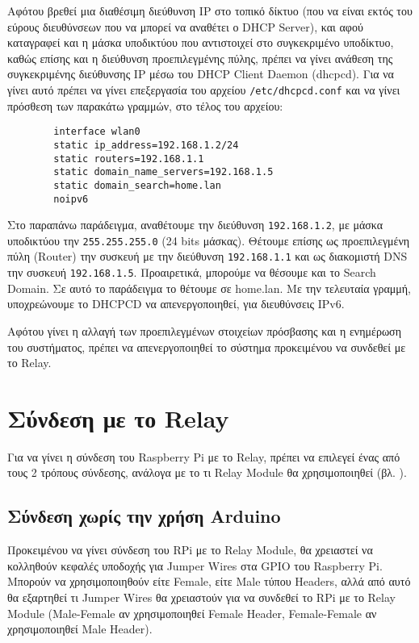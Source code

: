 		Αφότου βρεθεί μια διαθέσιμη διεύθυνση IP στο τοπικό δίκτυο (που να είναι εκτός του εύρους διευθύνσεων που να μπορεί να αναθέτει ο DHCP Server), και αφού καταγραφεί και η μάσκα υποδικτύου που αντιστοιχεί στο συγκεκριμένο υποδίκτυο, καθώς επίσης και η διεύθυνση προεπιλεγμένης πύλης, πρέπει να γίνει ανάθεση της συγκεκριμένης διεύθυνσης IP μέσω του DHCP Client Daemon (dhcpcd). Για να γίνει αυτό πρέπει να γίνει επεξεργασία του αρχείου \verb|/etc/dhcpcd.conf| και να γίνει πρόσθεση των παρακάτω γραμμών, στο τέλος του αρχείου:

		\begin{lstlisting}
		interface wlan0
		static ip_address=192.168.1.2/24
		static routers=192.168.1.1
		static domain_name_servers=192.168.1.5
		static domain_search=home.lan
		noipv6\end{lstlisting}

		Στο παραπάνω παράδειγμα, αναθέτουμε την διεύθυνση \verb|192.168.1.2|, με μάσκα υποδικτύου την \verb|255.255.255.0| (24 bits μάσκας). Θέτουμε επίσης ως προεπιλεγμένη πύλη (Router) την συσκευή με την διεύθυνση \verb|192.168.1.1| και ως διακομιστή DNS την συσκευή \verb|192.168.1.5|. Προαιρετικά, μπορούμε να θέσουμε και το Search Domain. Σε αυτό το παράδειγμα το θέτουμε σε home.lan. Με την τελευταία γραμμή, υποχρεώνουμε το DHCPCD να απενεργοποιηθεί, για διευθύνσεις IPv6.

	Αφότου γίνει η αλλαγή των προεπιλεγμένων στοιχείων πρόσβασης και η ενημέρωση του συστήματος, πρέπει να απενεργοποιηθεί το σύστημα προκειμένου να συνδεθεί με το Relay. 

\section{Σύνδεση με το Relay}
	Για να γίνει η σύνδεση του Raspberry Pi με το Relay, πρέπει να επιλεγεί ένας από τους 2 τρόπους σύνδεσης, ανάλογα με το τι Relay Module θα χρησιμοποιηθεί (βλ. ).

	\subsection{Σύνδεση χωρίς την χρήση Arduino}
		\label{subsec:gpio_conn}
		Προκειμένου να γίνει σύνδεση του RPi με το Relay Module, θα χρειαστεί να κολληθούν κεφαλές υποδοχής για Jumper Wires στα GPIO του Raspberry Pi. Μπορούν να χρησιμοποιηθούν είτε Female, είτε Male τύπου Headers, αλλά από αυτό θα εξαρτηθεί τι Jumper Wires θα χρειαστούν για να συνδεθεί το RPi με το Relay Module (Male-Female αν χρησιμοποιηθεί Female Header, Female-Female αν χρησιμοποιηθεί Male Header).

